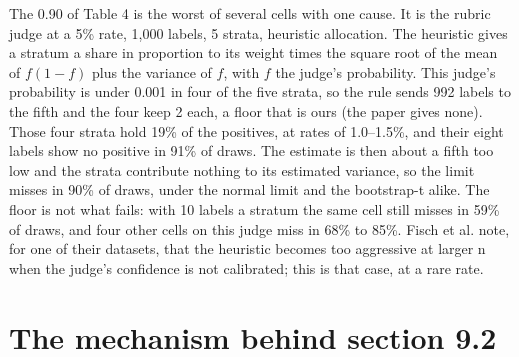 \documentclass[11pt]{article}
\begin{document}
The 0.90 of Table 4 is the worst of several cells with one cause. It is the rubric judge at a 5\% rate, 1,000 labels, 5 strata, heuristic allocation. The heuristic gives a stratum a share in proportion to its weight times the square root of the mean of $f (1 - f )$ plus the variance of $f$, with $f$ the judge's probability. This judge's probability is under 0.001 in four of the five strata, so the rule sends 992 labels to the fifth and the four keep 2 each, a floor that is ours (the paper gives none). Those four strata hold 19\% of the positives, at rates of 1.0--1.5\%, and their eight labels show no positive in 91\% of draws. The estimate is then about a fifth too low and the strata contribute nothing to its estimated variance, so the limit misses in 90\% of draws, under the normal limit and the bootstrap-t alike. The floor is not what fails: with 10 labels a stratum the same cell still misses in 59\% of draws, and four other cells on this judge miss in 68\% to 85\%. Fisch et al. note, for one of their datasets, that the heuristic becomes too aggressive at larger n when the judge's confidence is not calibrated; this is that case, at a rare rate.


\section{The mechanism behind section 9.2}
\end{document}
